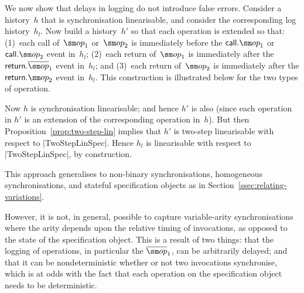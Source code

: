 We now show that delays in logging do not introduce false errors.  Consider a
history~$h$ that is synchronisation linearisable, and consider the
corresponding log history~$h_l$.  Now build a history~$h'$ so that each
operation is extended so that: (1)~each call of~$\op_1$ or~$\op_2$ is
immediately before the $\call.\op_1$ or $\call.\op_2$ event in~$h_l$; (2)~each
return of~$\op_1$ is immediately after the $\return.\overline\op_1$ event
in~$h_l$; and (3)~each return of~$\op_2$ is immediately after the
$\return.\op_2$ event in~$h_l$.  This construction is illustrated below for
the two types of operation.
%
\begin{center}
\end{center}
%
Now $h$ is synchronisation linearisable; and hence $h'$ is also (since each
operation in $h'$ is an extension of the corresponding operation in~$h$).  But
then Proposition~\ref{prop:two-step-lin} implies that $h'$ is two-step
linearisable with respect to |TwoStepLinSpec|.  Hence $h_l$ is linearisable
with respect to |TwoStepLinSpec|, by construction.

This approach generalises to non-binary synchronisations, homogeneous
synchronisations, and stateful specification objects as in
Section~\ref{ssec:relating-variations}.




However, it is not, in general, possible to capture variable-arity
synchronisations where the arity depends upon the relative timing of
invocations, as opposed to the state of the specification object.  This is a
result of two things: that the logging of operations, in particular the
$\overline{\op}_1$, can be arbitrarily delayed; and that it can be
nondeterministic whether or not two invocations synchronise, which is at odds
with the fact that each operation on the specification object needs to be
deterministic.

